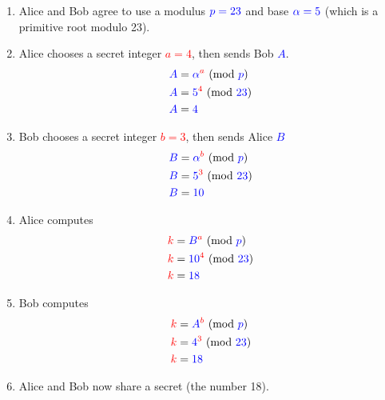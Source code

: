 \begin{enumerate}
    \item Alice and Bob agree to use a modulus $\textcolor{blue}{p = 23}$ and base $\textcolor{blue}{\alpha = 5}$ (which is a primitive root modulo 23).
    \item Alice chooses a secret integer \textcolor{red}{$a = 4$}, then sends Bob \textcolor{blue}{$A$}.
        \begin{equation*}
            \begin{split}
                \textcolor{blue}{A} &= \textcolor{blue}{\alpha}^{\textcolor{red}{a}} \ (\mathrm{mod}\ \textcolor{blue}{p}) \\
                \textcolor{blue}{A} &= \textcolor{blue}{5}^{\textcolor{red}{4}} \ (\mathrm{mod}\ \textcolor{blue}{23}) \\
                \textcolor{blue}{A} &= \textcolor{blue}{4}
            \end{split}
        \end{equation*}
    \item Bob chooses a secret integer \textcolor{red}{$b = 3$}, then sends Alice \textcolor{blue}{$B$}
        \begin{equation*}
            \begin{split}
                \textcolor{blue}{B} &= \textcolor{blue}{\alpha}^{\textcolor{red}{b}} \ (\mathrm{mod}\ \textcolor{blue}{p}) \\
                \textcolor{blue}{B} &= \textcolor{blue}{5}^{\textcolor{red}{3}} \ (\mathrm{mod}\ \textcolor{blue}{23}) \\
                \textcolor{blue}{B} &= \textcolor{blue}{10}
            \end{split}
        \end{equation*}
    \item Alice computes
        \begin{equation*}
            \begin{split}
                \textcolor{red}{k} &= \textcolor{blue}{B}^{\textcolor{red}{a}} \ (\mathrm{mod}\ \textcolor{blue}{p}) \\
                \textcolor{red}{k} &= \textcolor{blue}{10}^{\textcolor{red}{4}} \ (\mathrm{mod}\ \textcolor{blue}{23}) \\
                \textcolor{red}{k} &= \textcolor{blue}{18}
            \end{split}
        \end{equation*}
    \item Bob computes
        \begin{equation*}
            \begin{split}
                \textcolor{red}{k} &= \textcolor{blue}{A}^{\textcolor{red}{b}} \ (\mathrm{mod}\ \textcolor{blue}{p}) \\
                \textcolor{red}{k} &= \textcolor{blue}{4}^{\textcolor{red}{3}} \ (\mathrm{mod}\ \textcolor{blue}{23}) \\
                \textcolor{red}{k} &= \textcolor{blue}{18}
            \end{split}
        \end{equation*}
    \item Alice and Bob now share a secret (the number 18).
\end{enumerate}

